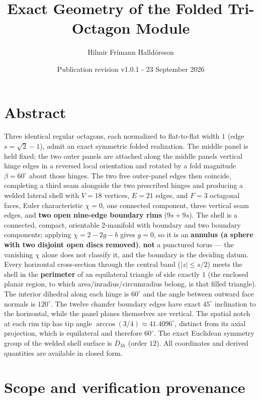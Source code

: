 \documentclass[
  11pt,
  a4paper,
]{article}
\title{Exact Geometry of the Folded Tri-Octagon Module}
\author{Hilmir Frímann Halldórsson}
\date{Publication revision v1.0.1 - 23 September 2026}
\begin{document}
\maketitle

\section{Abstract}\label{abstract}

Three identical regular octagons, each normalized to flat-to-flat width \(1\) (edge \(s=\sqrt2-1\)), admit an exact symmetric folded realization. The middle panel is held fixed; the two outer panels are attached along the middle panel\textquotesingle s vertical hinge edges in a reversed local orientation and rotated by a fold magnitude \(\beta=60^\circ\) about those hinges. The two free outer-panel edges then coincide, completing a third seam alongside the two prescribed hinges and producing a welded lateral shell with \(V=18\) vertices, \(E=21\) edges, and \(F=3\) octagonal faces, Euler characteristic \(\chi=0\), one connected component, three vertical seam edges, and \textbf{two open nine-edge boundary rims} (\(9s+9s\)). The shell is a connected, compact, orientable \(2\)-manifold with boundary and two boundary components; applying \(\chi=2-2g-b\) gives \(g=0\), so it is an \textbf{annulus (a sphere with two disjoint open discs removed)}, \textbf{not} a punctured torus --- the vanishing \(\chi\) alone does not classify it, and the boundary is the deciding datum. Every horizontal cross-section through the central band (\(|z|\le s/2\)) meets the shell in the \textbf{perimeter} of an equilateral triangle of side exactly \(1\) (the enclosed planar region, to which area/inradius/circumradius belong, is that filled triangle). The interior dihedral along each hinge is \(60^\circ\) and the angle between outward face normals is \(120^\circ\). The twelve chamfer boundary edges have exact \(45^\circ\) inclination to the horizontal, while the panel planes themselves are vertical. The spatial notch at each rim tip has tip angle \(\arccos(3/4)\approx41.4096^\circ\), distinct from its axial projection, which is equilateral and therefore \(60^\circ\). The exact Euclidean symmetry group of the welded shell surface is \(D_{3h}\) (order \(12\)). All coordinates and derived quantities are available in closed form.

\clearpage

\section{Scope and verification provenance}\label{scope-and-verification-provenance}
\end{document}
